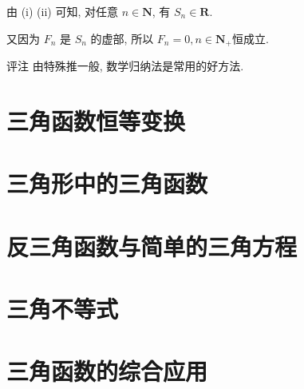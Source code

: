 	由 (i) (ii) 可知, 对任意 $n \in \mathbf{N}$, 有 $S_{n} \in \mathbf{R}$.

	又因为 $F_{n}$ 是 $S_{n}$ 的虚部, 所以 $F_{n}=0, n \in \mathbf{N}_{+}$恒成立.

评注 由特殊推一般, 数学归纳法是常用的好方法.



\section{三角函数恒等变换}
\section{三角形中的三角函数}
\section{反三角函数与简单的三角方程}
\section{三角不等式}
\section{三角函数的综合应用}